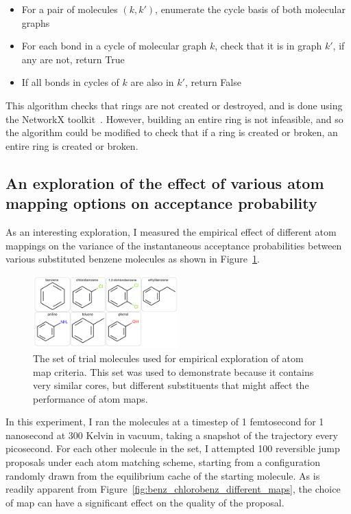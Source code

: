 %
\begin{itemize}
    \item For a pair of molecules $(k, k')$, enumerate the cycle basis of both molecular graphs~\cite{paton1969algorithm}
    \item For each bond in a cycle of molecular graph $k$, check that it is in graph $k'$, if any are not, return True
    \item If all bonds in cycles of $k$ are also in $k'$, return False
\end{itemize}
%
This algorithm checks that rings are not created or destroyed, and is done using the NetworkX toolkit~\cite{Hagberg2008}.
%
However, building an entire ring is not infeasible, and so the algorithm could be modified to check that if a ring is created or broken, an entire ring is created or broken.
%
\subsection{An exploration of the effect of various atom mapping options on acceptance probability}
%
As an interesting exploration, I measured the empirical effect of different atom mappings on the variance of the instantaneous acceptance probabilities between various substituted benzene molecules as shown in Figure~\ref{fig:substituded_benzene_maps}.
%
\begin{figure}
    \centering
    \includegraphics[width=0.5\textwidth]{mol_atom_map.png}
    \caption{The set of trial molecules used for empirical exploration of atom map criteria. This set was used to demonstrate because it contains very similar cores, but different substituents that might affect the performance of atom maps.
    }
    \label{fig:substituded_benzene_maps}
\end{figure}
%
In this experiment, I ran the molecules at a timestep of 1 femtosecond for 1 nanosecond at 300 Kelvin in vacuum, taking a snapshot of the trajectory every picosecond.
%
For each other molecule in the set, I attempted 100 reversible jump proposals under each atom matching scheme, starting from a configuration randomly drawn from the equilibrium cache of the starting molecule.
%
As is readily apparent from Figure~\ref{fig:benz_chlorobenz_different_maps}, the choice of map can have a significant effect on the quality of the proposal.
